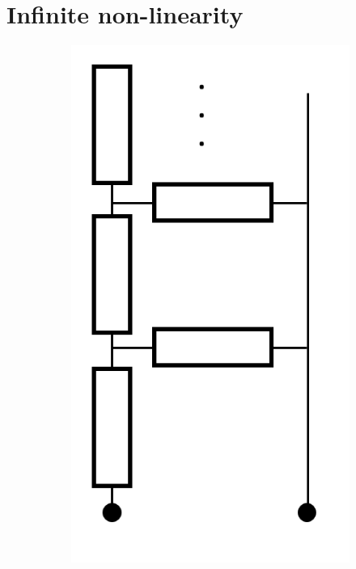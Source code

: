 \section*{Infinite non-linearity}

\begin{figure}
    \centering

    \begin{subfigure}[l]{.143\textwidth}
        \centering
        \includegraphics[width = \textwidth]{P-1}

\end{subfigure}
\end{figure}
